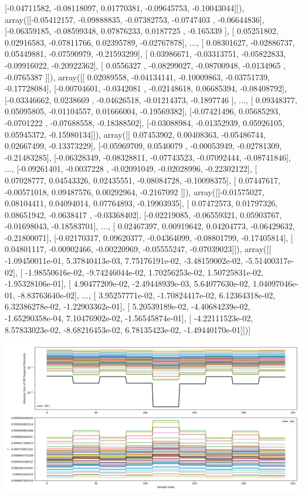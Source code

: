 \documentclass{article}
\begin{document}
       [-0.04711582, -0.08118097,  0.01770381, -0.09645753, -0.10043044]]), array([[-0.05412157, -0.09888835, -0.07382753, -0.0747403 , -0.06644836],
       [-0.06359185, -0.08599348,  0.07876233,  0.0187725 , -0.165339  ],
       [ 0.05251802,  0.02916583, -0.07811766,  0.02395789, -0.02767878],
       ..., 
       [ 0.08301627, -0.02886737,  0.05449881, -0.07590979, -0.21593299],
       [ 0.03986671, -0.03313751, -0.05822833, -0.09916022, -0.20922362],
       [ 0.0556327 , -0.08299027, -0.08700948, -0.0134965 , -0.0765387 ]]), array([[ 0.02089558, -0.04134141, -0.10009863, -0.03751739, -0.17728084],
       [-0.00704601, -0.0342081 , -0.02148618,  0.06685394, -0.08408792],
       [-0.03346662,  0.0238669 , -0.04626518, -0.01214373, -0.1897746 ],
       ..., 
       [ 0.09348377,  0.05095805, -0.01104557,  0.01666004, -0.19569382],
       [-0.07421496,  0.05685293, -0.0701222 , -0.07688558, -0.18388502],
       [-0.03088984, -0.01352939,  0.05926105,  0.05945372, -0.15980134]]), array([[ 0.07453902,  0.00408363, -0.05486744,  0.02667499, -0.13373229],
       [-0.05969709,  0.0540079 , -0.00053949, -0.02781309, -0.21483285],
       [-0.06328349, -0.08328811, -0.07743523, -0.07092444, -0.08741846],
       ..., 
       [-0.09261401, -0.0037228 , -0.02091049, -0.02028996, -0.22302122],
       [ 0.07028777,  0.04543326,  0.02435551, -0.08084728, -0.10098375],
       [ 0.07447617, -0.00571018,  0.09487576,  0.00292964, -0.2167092 ]]), array([[-0.01575027,  0.08104411,  0.04094014,  0.07764893, -0.19903935],
       [ 0.07472573,  0.01797326,  0.08651942, -0.0638417 , -0.03368402],
       [-0.02219085, -0.06559321,  0.05903767, -0.01698043, -0.18583701],
       ..., 
       [ 0.02467397,  0.00919642,  0.04204773, -0.06429632, -0.21800071],
       [-0.02170317,  0.09620377, -0.04364099, -0.08801799, -0.17405814],
       [ 0.04801117, -0.00902466, -0.00220969, -0.05555247, -0.07039023]]), array([[ -1.09450011e-01,   5.37840413e-03,   7.75176191e-02,
         -3.48159002e-02,  -5.51400317e-02],
       [ -1.98550616e-02,  -9.74246044e-02,   1.70256253e-02,
          1.50725831e-02,  -1.95328106e-01],
       [  4.90477209e-02,  -2.49448939e-03,   5.64077630e-02,
          1.04097046e-01,  -8.83763640e-02],
       ..., 
       [  3.95257771e-02,  -1.70824417e-02,   6.12364318e-02,
          6.32386278e-02,  -1.22903362e-01],
       [  5.20539189e-02,  -4.40684239e-02,  -1.65290358e-04,
          7.10476902e-02,  -1.56545874e-01],
       [ -4.22111523e-02,   8.57833023e-02,  -8.68216453e-02,
          6.78135423e-02,  -1.49440170e-01]])]
\begin{center}
\includegraphics[scale=.9]{report_pickled_controls253/control_dpn_all.png}

\end{center}
\end{document}

